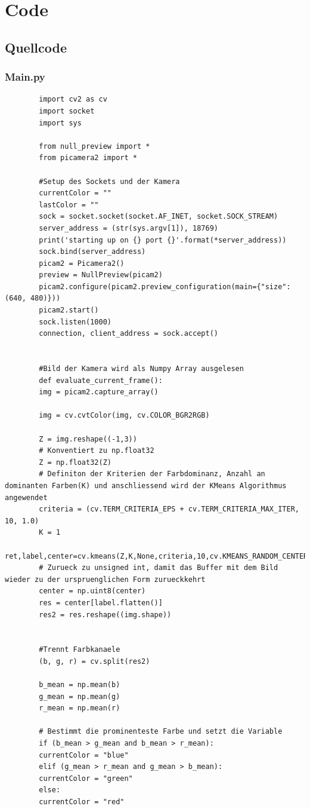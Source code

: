 \documentclass[10pt,a4paper]{report}
\begin{document}
	\newpage
	
	\part{Code}
	\chapter{Quellcode}
	
	
	\newpage
	\section{Main.py}
	\begin{lstlisting}
		import cv2 as cv
		import socket
		import sys
		
		from null_preview import *
		from picamera2 import *
		
		#Setup des Sockets und der Kamera
		currentColor = ""
		lastColor = ""
		sock = socket.socket(socket.AF_INET, socket.SOCK_STREAM)
		server_address = (str(sys.argv[1]), 18769)
		print('starting up on {} port {}'.format(*server_address))
		sock.bind(server_address)
		picam2 = Picamera2()
		preview = NullPreview(picam2)
		picam2.configure(picam2.preview_configuration(main={"size":(640, 480)}))
		picam2.start()
		sock.listen(1000)
		connection, client_address = sock.accept()
		
		
		#Bild der Kamera wird als Numpy Array ausgelesen
		def evaluate_current_frame():
		img = picam2.capture_array()
		
		img = cv.cvtColor(img, cv.COLOR_BGR2RGB)
		
		Z = img.reshape((-1,3))
		# Konventiert zu np.float32
		Z = np.float32(Z)
		# Definiton der Kriterien der Farbdominanz, Anzahl an dominanten Farben(K) und anschliessend wird der KMeans Algorithmus angewendet
		criteria = (cv.TERM_CRITERIA_EPS + cv.TERM_CRITERIA_MAX_ITER, 10, 1.0)
		K = 1
		ret,label,center=cv.kmeans(Z,K,None,criteria,10,cv.KMEANS_RANDOM_CENTERS)
		# Zurueck zu unsigned int, damit das Buffer mit dem Bild wieder zu der urspruenglichen Form zurueckkehrt
		center = np.uint8(center)
		res = center[label.flatten()]
		res2 = res.reshape((img.shape))
		
		
		#Trennt Farbkanaele
		(b, g, r) = cv.split(res2)
		
		b_mean = np.mean(b)
		g_mean = np.mean(g)
		r_mean = np.mean(r)
		
		# Bestimmt die prominenteste Farbe und setzt die Variable
		if (b_mean > g_mean and b_mean > r_mean):
		currentColor = "blue"
		elif (g_mean > r_mean and g_mean > b_mean):
		currentColor = "green"
		else:
		currentColor = "red"
		

\end{lstlisting}
\end{document}
